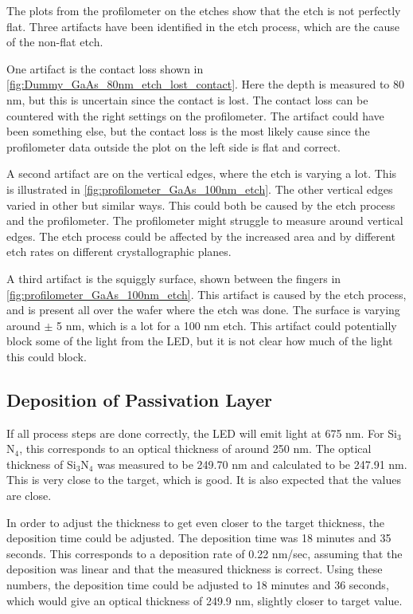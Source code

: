 The plots from the profilometer on the etches show that the etch is not perfectly flat.
Three artifacts have been identified in the etch process, which are the cause of the non-flat etch.

One artifact is the contact loss shown in \autoref{fig:Dummy_GaAs_80nm_etch_lost_contact}. 
Here the depth is measured to 80 nm, but this is uncertain since the contact is lost.
The contact loss can be countered with the right settings on the profilometer. 
The artifact could have been something else, but the contact loss is the most likely cause since the profilometer data outside the plot on the left side is flat and correct. 

A second artifact are on the vertical edges, where the etch is varying a lot. 
This is illustrated in \autoref{fig:profilometer_GaAs_100nm_etch}.
The other vertical edges varied in other but similar ways. 
This could both be caused by the etch process and the profilometer.
The profilometer might struggle to measure around vertical edges. 
The etch process could be affected by  the increased area and by different etch rates on different crystallographic planes.

A third artifact is the squiggly surface, shown between the fingers in \autoref{fig:profilometer_GaAs_100nm_etch}. 
This artifact is caused by the etch process, and is present all over the wafer where the etch was done. 
The surface is varying around $\pm$ 5 nm, which is a lot for a 100 nm etch.
This artifact could potentially block some of the light from the LED, but it is not clear how much of the light this could block.

\subsection{Deposition of Passivation Layer} 
If all process steps are done correctly, the LED will emit light at 675 nm.  
For Si$_3$N$_4$, this corresponds to an optical thickness of around 250 nm.
The optical thickness of Si$_3$N$_4$ was measured to be 249.70 nm and calculated to be 247.91 nm.
This is very close to the target, which is good.
It is also expected that the values are close.

In order to adjust the thickness to get even closer to the target thickness, the deposition time could be adjusted.
The deposition time was 18 minutes and 35 seconds.
This corresponds to a deposition rate of 0.22 nm/sec, assuming that the deposition was linear and that the measured thickness is correct.
Using these numbers, the deposition time could be adjusted to 18 minutes and 36 seconds, which would give an optical thickness of 249.9 nm, slightly closer to target value.

